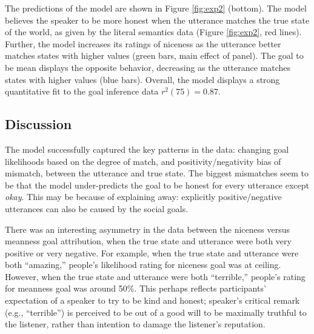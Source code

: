 \documentclass[10pt,letterpaper]{article}
\newcommand{\mht}[1]{\textcolor{DarkOrange}{[mht: #1]}}
\begin{document}


The predictions of the model are shown in Figure \ref{fig:exp2} (bottom).
The model believes the speaker to be more honest when the utterance matches the true state of the world, as given by the literal semantics data (Figure \ref{fig:exp2}, red lines). 
Further, the model increases its ratings of niceness as the utterance better matches states with higher values (green bars, main effect of panel).
The goal to be mean displays the opposite behavior, decreasing as the utterance matches states with higher values (blue bars).
Overall, the model displays a strong quantitative fit to the goal inference data $r^2(75) = 0.87$.


\subsection{Discussion}

The model successfully captured the key patterns in the data: 
changing goal likelihoods based on the degree of match, and positivity/negativity bias of mismatch, between the utterance and true state. 
The biggest mismatches seem to be that the model under-predicts the goal to be honest for every utterance except \emph{okay}.
This may be because of explaining away: explicitly positive/negative utterances can also be caused by the social goals. 

There was an interesting asymmetry in the data between the niceness versus meanness goal attribution, 
when the true state and utterance were both very positive or very negative. 
For example, when the true state and utterance were both ``amazing,'' people's likelihood rating for niceness goal was at ceiling. 
However, when the true state and utterance were both ``terrible,'' people's rating for meanness goal was around 50\%. 
This perhaps reflects participants' expectation of a speaker to try to be kind and honest; 
speaker's critical remark (e.g., ``terrible'') is perceived to be out of a good will to be maximally truthful to the listener, 
rather than intention to damage the listener's reputation. 
\end{document}
